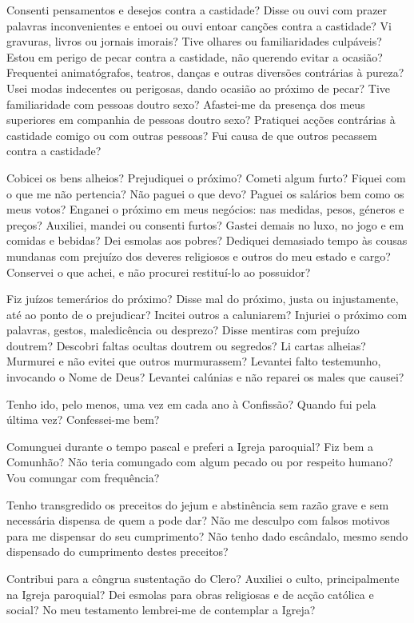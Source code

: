 Consenti pensamentos e desejos contra a castidade? Disse ou ouvi com prazer palavras inconvenientes e entoei ou ouvi entoar canções contra a castidade? Vi gravuras, livros ou jornais imorais? Tive olhares ou familiaridades culpáveis? Estou em perigo de pecar contra a castidade, não querendo evitar a ocasião? Frequentei animatógrafos, teatros, danças e outras diversões contrárias à pureza? Usei modas indecentes ou perigosas, dando ocasião ao próximo de pecar? Tive familiaridade com pessoas doutro sexo? Afastei-me da presença dos meus superiores em companhia de pessoas doutro sexo? Pratiquei acções contrárias à castidade comigo ou com outras pessoas? Fui causa de que outros pecassem contra a castidade?

Cobicei os bens alheios? Prejudiquei o próximo? Cometi algum furto? Fiquei com o que me não pertencia? Não paguei o que devo? Paguei os salários bem como os meus votos? Enganei o próximo em meus negócios: nas medidas, pesos, géneros e preços? Auxiliei, mandei ou consenti furtos? Gastei demais no luxo, no jogo e em comidas e bebidas? Dei esmolas aos pobres? Dediquei demasiado tempo às cousas mundanas com prejuízo dos deveres religiosos e outros do meu estado e cargo? Conservei o que achei, e não procurei restituí-lo ao possuidor?

Fiz juízos temerários do próximo? Disse mal do próximo, justa ou injustamente, até ao ponto de o prejudicar? Incitei outros a caluniarem? Injuriei o próximo com palavras, gestos, maledicência ou desprezo? Disse mentiras com prejuízo doutrem? Descobri faltas ocultas doutrem ou segredos? Li cartas alheias? Murmurei e não evitei que outros murmurassem? Levantei falto testemunho, invocando o Nome de Deus? Levantei calúnias e não reparei os males que causei?

Tenho ido, pelo menos, uma vez em cada ano à Confissão? Quando fui pela última vez? Confessei-me bem?

Comunguei durante o tempo pascal e preferi a Igreja paroquial? Fiz bem a Comunhão? Não teria comungado com algum pecado ou por respeito humano? Vou comungar com frequência?

Tenho transgredido os preceitos do jejum e abstinência sem razão grave e sem necessária dispensa de quem a pode dar? Não me desculpo com falsos motivos para me dispensar do seu cumprimento? Não tenho dado escândalo, mesmo sendo dispensado do cumprimento destes preceitos?

Contribui para a côngrua sustentação do Clero? Auxiliei o culto, principalmente na Igreja paroquial? Dei esmolas para obras religiosas e de acção católica e social? No meu testamento lembrei-me de contemplar a Igreja?

